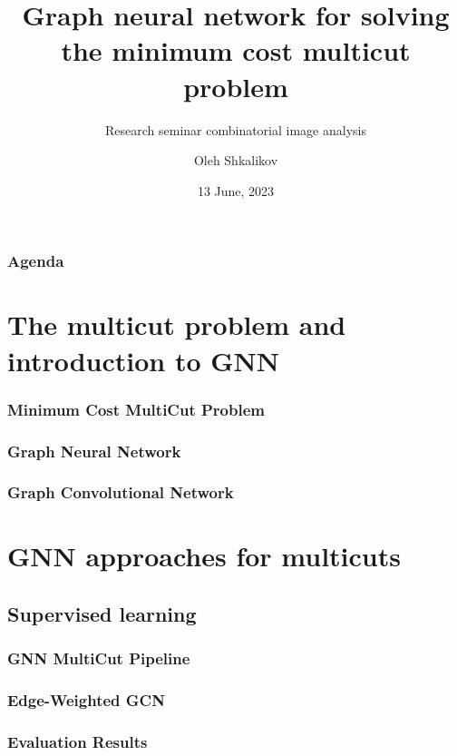 \documentclass{beamer}
\title[MultiCut GNN]{Graph neural network for solving the minimum cost multicut problem}
\subtitle{Research seminar combinatorial image analysis}
\author{Oleh Shkalikov}
\institute[TU Dresden]{TU Dresden, Computer Science Faculty}
\date{13 June, 2023}
\begin{document}
\frame{\titlepage}

\begin{frame}
    \frametitle{Agenda}
    \tableofcontents
\end{frame}

\section{The multicut problem and introduction to GNN}

\begin{frame}
    \frametitle{Minimum Cost MultiCut Problem}



\end{frame}

\begin{frame}
    \frametitle{Graph Neural Network}



\end{frame}

\begin{frame}
    \frametitle{Graph Convolutional Network}



\end{frame}

\section{GNN approaches for multicuts}

\subsection{Supervised learning}

\begin{frame}
    \frametitle{GNN MultiCut Pipeline}



\end{frame}

\begin{frame}
    \frametitle{Edge-Weighted GCN}



\end{frame}

\begin{frame}
    \frametitle{Evaluation Results}



\end{frame}
\end{document}
